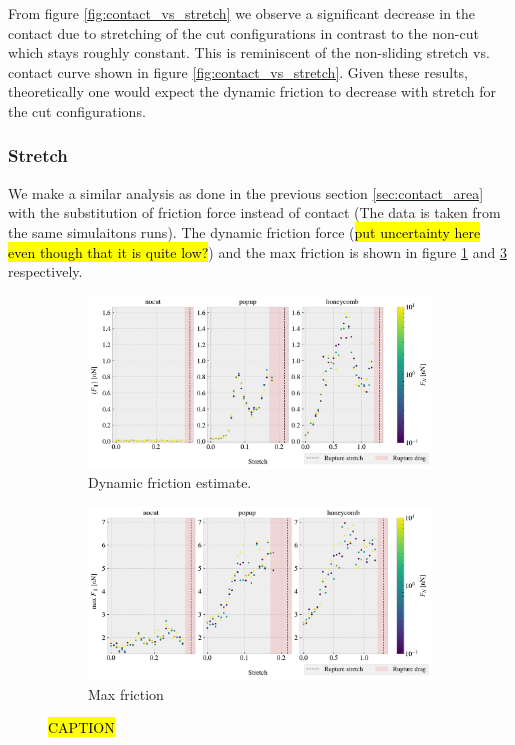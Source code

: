 From figure \ref{fig:contact_vs_stretch} we observe a significant decrease in the contact due to stretching of the cut configurations in contrast to the non-cut which stays roughly constant. This is reminiscent of the non-sliding stretch vs. contact curve shown in figure \ref{fig:contact_vs_stretch}. Given these results, theoretically one would expect the dynamic friction to decrease with stretch for the cut configurations.


\subsubsection{Stretch} 

We make a similar analysis as done in the previous section \ref{sec:contact_area} with the substitution of friction force instead of contact (The data is taken from the same simulaitons runs). The dynamic friction force (\hl{put uncertainty here even though that it is quite low?}) and the max friction is shown in figure \ref{fig:multi_stretch_mean_fric} and \ref{fig:multi_stretch_max_fric} respectively.



\begin{figure}[H]
  \centering
  \begin{subfigure}[t]{\textwidth}
      \centering
      \includegraphics[width=\textwidth]{figures/baseline/multi_stretch_mean_compare.pdf}
      \caption{Dynamic friction estimate. }
      \label{fig:multi_stretch_mean_fric}
  \end{subfigure}
  \hfill
  \begin{subfigure}[t]{\textwidth}
      \centering
      \includegraphics[width=\textwidth]{figures/baseline/multi_stretch_max_compare.pdf}
      \caption{Max friction}
      \label{fig:multi_stretch_max_fric}
  \end{subfigure}
  \hfill
     \caption{\hl{CAPTION}}
     \label{fig:multi_stretch_max_fric}
\end{figure}


